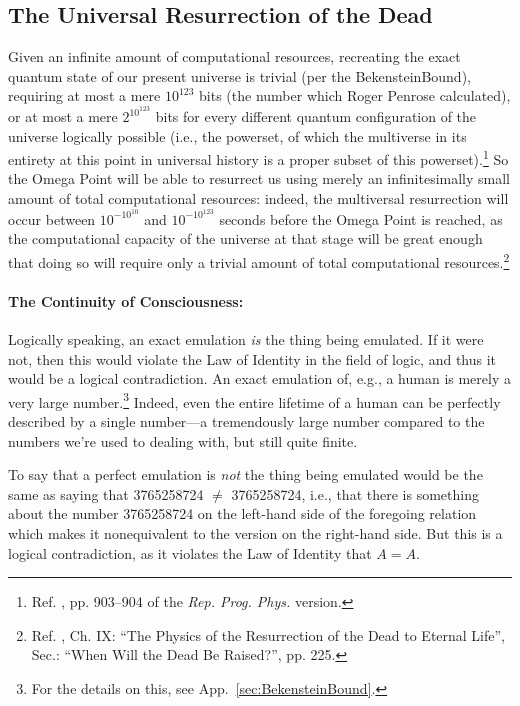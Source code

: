\documentclass[letterpaper,12pt]{article}
\begin{document}
\subsection{The Universal Resurrection of the Dead}
\label{subsec:UniversalResurrectionOfTheDead}

Given an infinite amount of computational resources, recreating the exact quantum state of our present universe is trivial (per the \gls{BekensteinBound}), requiring at most a mere \( 10^{123} \) bits (the number which Roger Penrose calculated), or at most a mere \( 2^{10^{123}} \) bits for every different quantum configuration of the universe logically possible (i.e., the powerset, of which the multiverse in its entirety at this point in universal history is a proper subset of this powerset).\footnote{Ref. , pp. 903--904 of the \emph{Rep. Prog. Phys.} version.} So the Omega Point will be able to resurrect us using merely an infinitesimally small amount of total computational resources: indeed, the multiversal resurrection will occur between \( 10^{-10^{10}} \) and \( 10^{-10^{123}} \) seconds before the Omega Point is reached, as the computational capacity of the universe at that stage will be great enough that doing so will require only a trivial amount of total computational resources.\footnote{Ref. , Ch. IX: ``The Physics of the Resurrection of the Dead to Eternal Life'', Sec.: ``When Will the Dead Be Raised?'', pp. 225.}

\paragraph{The Continuity of Consciousness:}
\label{parag:ContinuityOfConsciousness}

Logically speaking, an exact emulation \emph{is} the thing being emulated. If it were not, then this would violate the Law of Identity in the field of logic, and thus it would be a logical contradiction. An exact emulation of, e.g., a human is merely a very large number.\footnote{For the details on this, see App.~\ref{sec:BekensteinBound}.} Indeed, even the entire lifetime of a human can be perfectly described by a single number---a tremendously large number compared to the numbers we're used to dealing with, but still quite finite.

To say that a perfect emulation is \emph{not} the thing being emulated would be the same as saying that 3765258724 \( \neq \) 3765258724, i.e., that there is something about the number 3765258724 on the left-hand side of the foregoing relation which makes it nonequivalent to the version on the right-hand side. But this is a logical contradiction, as it violates the Law of Identity that \( A = A \).
\end{document}

